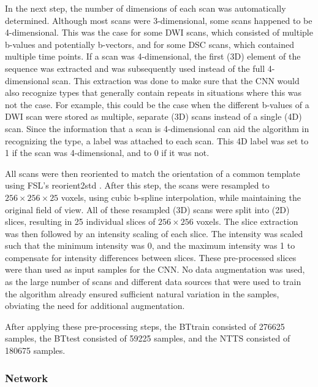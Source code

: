 In the next step, the number of dimensions of each \gls{scan} was automatically determined.
Although most \glspl{scan} were 3-dimensional, some \glspl{scan} happened to be 4-dimensional.
This was the case for some \gls{DWI} \glspl{scan}, which consisted of multiple b-values and potentially b-vectors, and for some \gls{DSC} \glspl{scan}, which contained multiple time points.
If a \gls{scan} was 4-dimensional, the first (3D) element of the sequence was extracted and was subsequently used instead of the full 4-dimensional \gls{scan}.
This extraction was done to make sure that the \gls{CNN} would also recognize \glspl{type} that generally contain repeats in situations where this was not the case.
For example, this could be the case when the different b-values of a \gls{DWI} \gls{scan} were stored as multiple, separate (3D) \glspl{scan} instead of a single (4D) \gls{scan}.
Since the information that a \gls{scan} is 4-dimensional can aid the algorithm in recognizing the \gls{type}, a  label was attached to each \gls{scan}.
This 4D label was set to 1 if the \gls{scan} was 4-dimensional, and to 0 if it was not.

All \glspl{scan} were then reoriented to match the orientation of a common template using FSL's reorient2std \autocite{jenkinson2012fsl}.
After this step, the \glspl{scan} were resampled to $ 256 \times 256 \times 25$ voxels, using cubic b-spline interpolation, while maintaining the original field of view.
All of these resampled (3D) \glspl{scan} were split into (2D) \glspl{slice}, resulting in \num{25} individual \glspl{slice} of $256 \times 256$ voxels.
The \gls{slice} extraction was then followed by an intensity scaling of each \gls{slice}.
The intensity was scaled such that the minimum intensity was 0, and the maximum intensity was \num{1} to compensate for intensity differences between \glspl{slice}.
These pre-processed \glspl{slice} were than used as input \glspl{sample} for the \gls{CNN}.
No data augmentation was used, as the large number of \glspl{scan} and different data sources that were used to train the algorithm already ensured sufficient natural variation in the \glspl{sample}, obviating the need for additional augmentation.

After applying these pre-processing steps, the \gls{BTtrain} consisted of \num{276625} \glspl{sample}, the \gls{BTtest} consisted of \num{59225} \glspl{sample}, and the \gls{NTTS} consisted of \num{180675} \glspl{sample}.

\subsubsection{Network}
\label{sec:network}

